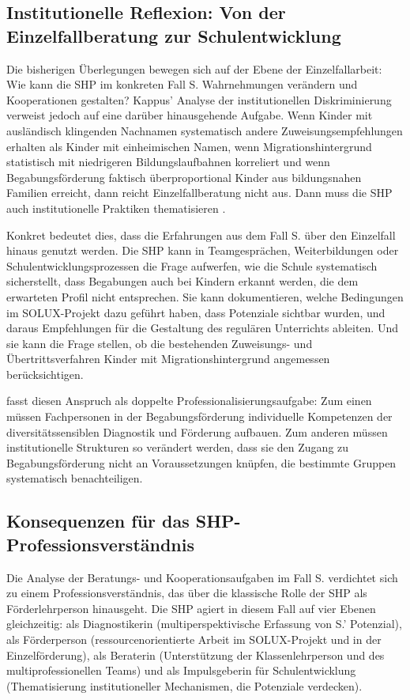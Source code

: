 \documentclass[ngerman, a4paper]{article}
\begin{document}
\subsection{Institutionelle Reflexion: Von der Einzelfallberatung zur Schulentwicklung}

Die bisherigen Überlegungen bewegen sich auf der Ebene der Einzelfallarbeit: Wie
kann die SHP im konkreten Fall S. Wahrnehmungen verändern und Kooperationen
gestalten? Kappus' Analyse der institutionellen Diskriminierung verweist jedoch
auf eine darüber hinausgehende Aufgabe. Wenn Kinder mit ausländisch klingenden
Nachnamen systematisch andere Zuweisungsempfehlungen erhalten als Kinder mit
einheimischen Namen, wenn Migrationshintergrund statistisch mit niedrigeren
Bildungslaufbahnen korreliert und wenn Begabungsförderung faktisch
überproportional Kinder aus bildungsnahen Familien erreicht, dann reicht
Einzelfallberatung nicht aus. Dann muss die SHP auch institutionelle Praktiken
thematisieren \parencite{kappus2010migration}.

Konkret bedeutet dies, dass die Erfahrungen aus dem Fall S. über den Einzelfall
hinaus genutzt werden. Die SHP kann in Teamgesprächen, Weiterbildungen oder
Schulentwicklungsprozessen die Frage aufwerfen, wie die Schule systematisch
sicherstellt, dass Begabungen auch bei Kindern erkannt werden, die dem
erwarteten Profil nicht entsprechen. Sie kann dokumentieren, welche Bedingungen
im SOLUX-Projekt dazu geführt haben, dass Potenziale sichtbar wurden, und
daraus Empfehlungen für die Gestaltung des regulären Unterrichts ableiten.
Und sie kann die Frage stellen, ob die bestehenden Zuweisungs- und
Übertrittsverfahren Kinder mit Migrationshintergrund angemessen berücksichtigen.

\textcite{macha2019gender} fasst diesen Anspruch als doppelte Professionalisierungsaufgabe: Zum einen
müssen Fachpersonen in der Begabungsförderung individuelle Kompetenzen der
diversitätssensiblen Diagnostik und Förderung aufbauen. Zum anderen müssen
institutionelle Strukturen so verändert werden, dass sie den Zugang zu
Begabungsförderung nicht an Voraussetzungen knüpfen, die bestimmte
Gruppen systematisch benachteiligen.

\subsection{Konsequenzen für das SHP-Professionsverständnis}

Die Analyse der Beratungs- und Kooperationsaufgaben im Fall S. verdichtet sich
zu einem Professionsverständnis, das über die klassische Rolle der SHP als
Förderlehrperson hinausgeht. Die SHP agiert in diesem Fall auf vier Ebenen
gleichzeitig: als Diagnostikerin (multiperspektivische Erfassung von S.'
Potenzial), als Förderperson (ressourcenorientierte Arbeit im SOLUX-Projekt und
in der Einzelförderung), als Beraterin (Unterstützung der Klassenlehrperson und
des multiprofessionellen Teams) und als Impulsgeberin für Schulentwicklung
(Thematisierung institutioneller Mechanismen, die Potenziale verdecken).
\end{document}
